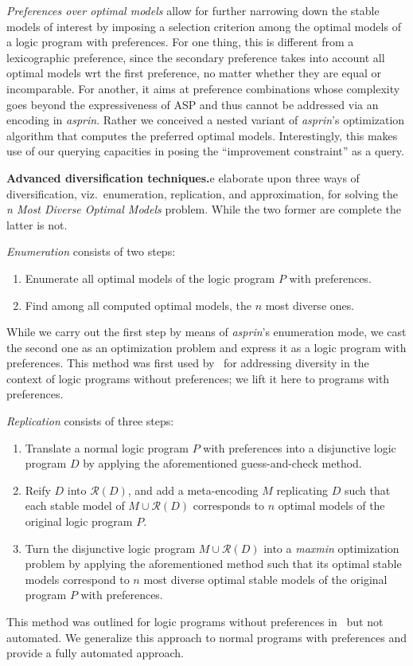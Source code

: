 \documentclass[a4paper,UKenglish]{oasics}
\newcommand{\sysfont}{\textit}
\newcommand{\asprin}{\sysfont{asprin}}
\newcommand{\mysubsection}[2]{\smallskip\noindent\textbf{#1.}}
\newcommand{\mysubparagraph}[1]{\par\textit{#1}}
\begin{document}
\mysubparagraph{Preferences over optimal models}
%
allow for further narrowing down the stable models of interest by imposing a selection criterion among the optimal models of a logic program with preferences.
%
For one thing, this is different from a lexicographic preference, since the secondary preference takes into account all optimal models wrt the first
preference, no matter whether they are equal or incomparable.
For another, it aims at preference combinations whose complexity goes beyond the expressiveness of ASP and thus cannot be addressed via an encoding
in \asprin.
Rather we conceived a nested variant of \asprin's optimization algorithm that computes the preferred optimal models.
Interestingly, this makes use of our querying capacities in posing the ``improvement constraint'' as a query.

\mysubsection{Advanced diversification techniques}
We elaborate upon three ways of diversification, viz.\ enumeration, replication, and approximation,
for solving the \emph{n Most Diverse Optimal Models} problem. 
%
While the two former are complete the latter is not.

%
\mysubparagraph{Enumeration} consists of two steps:
\begin{enumerate}
\item Enumerate all optimal models of the logic program $P$ with preferences. 
\item Find among all computed optimal models, the $n$ most diverse ones.
\end{enumerate}
While we carry out the first step by means of \asprin's enumeration mode,
we cast the second one as an optimization problem and express it as a logic program with preferences.
%
This method was first used by~\cite{eiererfi13a} for addressing diversity in the context of logic programs without preferences;
we lift it here to programs with preferences.

\mysubparagraph{Replication} consists of three steps:
\begin{enumerate}
\item Translate a normal logic program $P$ with preferences into a disjunctive logic program $D$
  by applying the aforementioned guess-and-check method.
\item Reify $D$ into $\mathcal{R}(D)$, and add a meta-encoding $M$ replicating $D$ 
  such that each stable model of $M \cup \mathcal{R}(D)$ 
  corresponds to $n$ optimal models of the original logic program $P$.
\item Turn the disjunctive logic program $M \cup \mathcal{R}(D)$ into a \emph{maxmin} optimization problem
  by applying the aforementioned method such that its optimal stable models
  correspond to $n$ most diverse optimal stable models of the original program $P$ with preferences.
\end{enumerate}
%
This method was outlined for logic programs without preferences in~\cite{eiererfi13a} but not automated.
We generalize this approach to normal programs with preferences and provide a fully automated approach.
\end{document}
